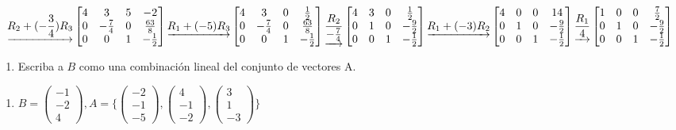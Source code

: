 \documentclass[
  11,
]{article}
\providecommand{\tightlist}{%
  \setlength{\itemsep}{0pt}\setlength{\parskip}{0pt}}
\begin{document}
\[\underrightarrow{ R_2 + (- \frac{3}{4})R_3 }
\left[\begin{matrix}4 & 3 & 5 & -2\\0 & - \frac{7}{4} & 0 & \frac{63}{8}\\0 & 0 & 1 & - \frac{1}{2}\end{matrix}\right]
\underrightarrow{ R_1 + (-5)R_3 }
\\
\left[\begin{matrix}4 & 3 & 0 & \frac{1}{2}\\0 & - \frac{7}{4} & 0 & \frac{63}{8}\\0 & 0 & 1 & - \frac{1}{2}\end{matrix}\right]
\underrightarrow{ \frac{R_2}{- \frac{7}{4}} }
\left[\begin{matrix}4 & 3 & 0 & \frac{1}{2}\\0 & 1 & 0 & - \frac{9}{2}\\0 & 0 & 1 & - \frac{1}{2}\end{matrix}\right]
\underrightarrow{ R_1 + (-3)R_2 }
\\
\left[\begin{matrix}4 & 0 & 0 & 14\\0 & 1 & 0 & - \frac{9}{2}\\0 & 0 & 1 & - \frac{1}{2}\end{matrix}\right]
\underrightarrow{ \frac{R_1}{4} }
\left[\begin{matrix}1 & 0 & 0 & \frac{7}{2}\\0 & 1 & 0 & - \frac{9}{2}\\0 & 0 & 1 & - \frac{1}{2}\end{matrix}\right]
  \]

\begin{enumerate}
\def\labelenumi{\arabic{enumi}.}
\setcounter{enumi}{2}
\tightlist
\item
  Escriba a \(B\) como una combinación lineal del conjunto de vectores
  A.
\end{enumerate}

\begin{enumerate}
\def\labelenumi{\alph{enumi})}
\tightlist
\item
  \(B = \begin{pmatrix} -1 \\ -2 \\ 4\end{pmatrix}, A = \{\begin{pmatrix}-2 \\ -1 \\ -5\end{pmatrix}, \begin{pmatrix}4 \\ -1 \\ -2\end{pmatrix}, \begin{pmatrix}3 \\ 1 \\ -3\end{pmatrix}\}\)
\end{enumerate}
\end{document}
